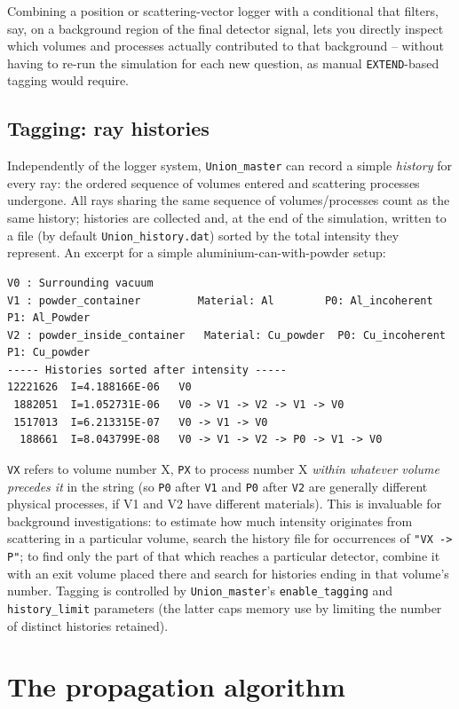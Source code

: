 Combining a position or scattering-vector logger with a conditional that
filters, say, on a background region of the final detector signal, lets you
directly inspect which volumes and processes actually contributed to that
background -- without having to re-run the simulation for each new
question, as manual \texttt{EXTEND}-based tagging would require.

\subsection{Tagging: ray histories}
\label{sec:union-tagging}

Independently of the logger system, \texttt{Union\_master} can record a
simple \emph{history} for every ray: the ordered sequence of volumes
entered and scattering processes undergone. All rays sharing the same
sequence of volumes/processes count as the same history; histories are
collected and, at the end of the simulation, written to a file (by default
\texttt{Union\_history.dat}) sorted by the total intensity they represent.
An excerpt for a simple aluminium-can-with-powder setup:
\begin{lstlisting}
V0 : Surrounding vacuum
V1 : powder_container         Material: Al        P0: Al_incoherent P1: Al_Powder
V2 : powder_inside_container   Material: Cu_powder  P0: Cu_incoherent  P1: Cu_powder
----- Histories sorted after intensity -----
12221626  I=4.188166E-06   V0
 1882051  I=1.052731E-06   V0 -> V1 -> V2 -> V1 -> V0
 1517013  I=6.213315E-07   V0 -> V1 -> V0
  188661  I=8.043799E-08   V0 -> V1 -> V2 -> P0 -> V1 -> V0
\end{lstlisting}
\texttt{VX} refers to volume number X, \texttt{PX} to process number X
\emph{within whatever volume precedes it} in the string (so \texttt{P0}
after \texttt{V1} and \texttt{P0} after \texttt{V2} are generally different
physical processes, if V1 and V2 have different materials). This is
invaluable for background investigations: to estimate how much intensity
originates from scattering in a particular volume, search the history file
for occurrences of \texttt{"VX -> P"}; to find only the part of that which
reaches a particular detector, combine it with an exit volume placed there
and search for histories ending in that volume's number. Tagging is
controlled by \texttt{Union\_master}'s \texttt{enable\_tagging} and
\texttt{history\_limit} parameters (the latter caps memory use by limiting
the number of distinct histories retained).

\section{The propagation algorithm}
\label{sec:union-algorithm}

